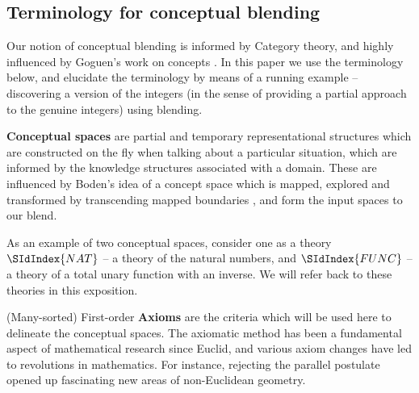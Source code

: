 

\subsection{Terminology for conceptual blending}
Our notion of conceptual blending is informed by Category theory, and
highly influenced by Goguen's work on concepts \parencite{Gog05b}. In
this paper we use the terminology below, and elucidate the terminology
by means of a running example -- discovering a version of the integers
(in the sense of providing a partial approach to the genuine integers)
using blending.

{\bf Conceptual spaces} are partial and temporary representational
structures which are constructed on the fly when talking about a
particular situation, which are informed by the knowledge structures
associated with a domain. These are influenced by Boden's idea of a
concept space which is mapped, explored and transformed by
transcending mapped boundaries \parencite{boden}, and form the input spaces
to our blend. 

As an example of two conceptual spaces, consider one as a theory
$\SIdIndex{NAT}$ --
a theory of the natural numbers, and $\SIdIndex{FUNC}$ -- a theory of a total
unary function with an inverse. 
We will refer back to these theories in this exposition.

(Many-sorted) First-order {\bf Axioms} are the criteria which will be
used here to delineate the conceptual
spaces. The axiomatic method has been a fundamental aspect of
mathematical research since Euclid, and various axiom changes have led
to revolutions in mathematics. For instance, 
rejecting
the parallel postulate opened up fascinating new areas of
non-Euclidean geometry.

